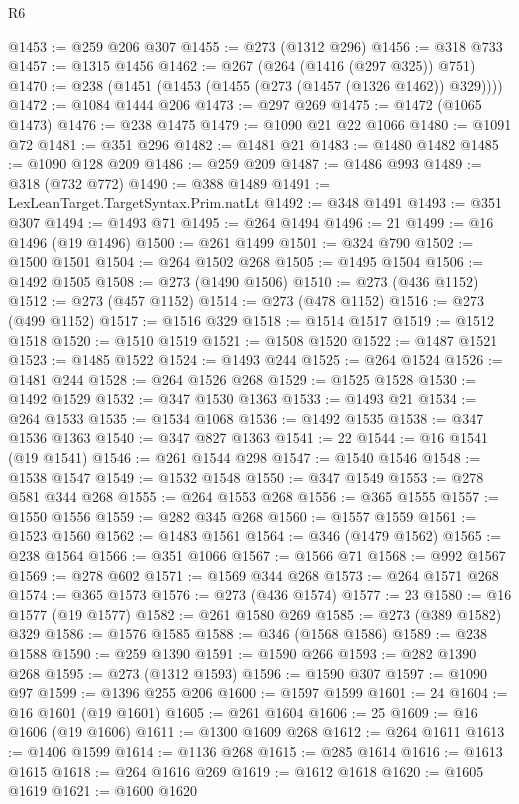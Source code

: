 \begin{lexlean}{R6}
\begin{coremodule}
{{{{{{{{{{{{{{{{{{{@1453 := @259 @206 @307
@1455 := @273 (@1312 @296)
@1456 := @318 @733
@1457 := @1315 @1456
@1462 := @267 (@264 (@1416 (@297 @325)) @751)
@1470 := @238 (@1451 (@1453 (@1455 (@273 (@1457 (@1326 @1462)) @329))))
@1472 := @1084 @1444 @206
@1473 := @297 @269
@1475 := @1472 (@1065 @1473)
@1476 := @238 @1475
@1479 := @1090 @21 @22 @1066
@1480 := @1091 @72
@1481 := @351 @296
@1482 := @1481 @21
@1483 := @1480 @1482
@1485 := @1090 @128 @209
@1486 := @259 @209
@1487 := @1486 @993
@1489 := @318 (@732 @772)
@1490 := @388 @1489
@1491 := LexLeanTarget.TargetSyntax.Prim.natLt
@1492 := @348 @1491
@1493 := @351 @307
@1494 := @1493 @71
@1495 := @264 @1494
@1496 := 21
@1499 := @16 @1496 (@19 @1496)
@1500 := @261 @1499
@1501 := @324 @790
@1502 := @1500 @1501
@1504 := @264 @1502 @268
@1505 := @1495 @1504
@1506 := @1492 @1505
@1508 := @273 (@1490 @1506)
@1510 := @273 (@436 @1152)
@1512 := @273 (@457 @1152)
@1514 := @273 (@478 @1152)
@1516 := @273 (@499 @1152)
@1517 := @1516 @329
@1518 := @1514 @1517
@1519 := @1512 @1518
@1520 := @1510 @1519
@1521 := @1508 @1520
@1522 := @1487 @1521
@1523 := @1485 @1522
@1524 := @1493 @244
@1525 := @264 @1524
@1526 := @1481 @244
@1528 := @264 @1526 @268
@1529 := @1525 @1528
@1530 := @1492 @1529
@1532 := @347 @1530 @1363
@1533 := @1493 @21
@1534 := @264 @1533
@1535 := @1534 @1068
@1536 := @1492 @1535
@1538 := @347 @1536 @1363
@1540 := @347 @827 @1363
@1541 := 22
@1544 := @16 @1541 (@19 @1541)
@1546 := @261 @1544 @298
@1547 := @1540 @1546
@1548 := @1538 @1547
@1549 := @1532 @1548
@1550 := @347 @1549
@1553 := @278 @581 @344 @268
@1555 := @264 @1553 @268
@1556 := @365 @1555
@1557 := @1550 @1556
@1559 := @282 @345 @268
@1560 := @1557 @1559
@1561 := @1523 @1560
@1562 := @1483 @1561
@1564 := @346 (@1479 @1562)
@1565 := @238 @1564
@1566 := @351 @1066
@1567 := @1566 @71
@1568 := @992 @1567
@1569 := @278 @602
@1571 := @1569 @344 @268
@1573 := @264 @1571 @268
@1574 := @365 @1573
@1576 := @273 (@436 @1574)
@1577 := 23
@1580 := @16 @1577 (@19 @1577)
@1582 := @261 @1580 @269
@1585 := @273 (@389 @1582) @329
@1586 := @1576 @1585
@1588 := @346 (@1568 @1586)
@1589 := @238 @1588
@1590 := @259 @1390
@1591 := @1590 @266
@1593 := @282 @1390 @268
@1595 := @273 (@1312 @1593)
@1596 := @1590 @307
@1597 := @1090 @97
@1599 := @1396 @255 @206
@1600 := @1597 @1599
@1601 := 24
@1604 := @16 @1601 (@19 @1601)
@1605 := @261 @1604
@1606 := 25
@1609 := @16 @1606 (@19 @1606)
@1611 := @1300 @1609 @268
@1612 := @264 @1611
@1613 := @1406 @1599
@1614 := @1136 @268
@1615 := @285 @1614
@1616 := @1613 @1615
@1618 := @264 @1616 @269
@1619 := @1612 @1618
@1620 := @1605 @1619
@1621 := @1600 @1620
}}}}}}}}}}}}}}}}}}}
\end{coremodule}
\end{lexlean}

